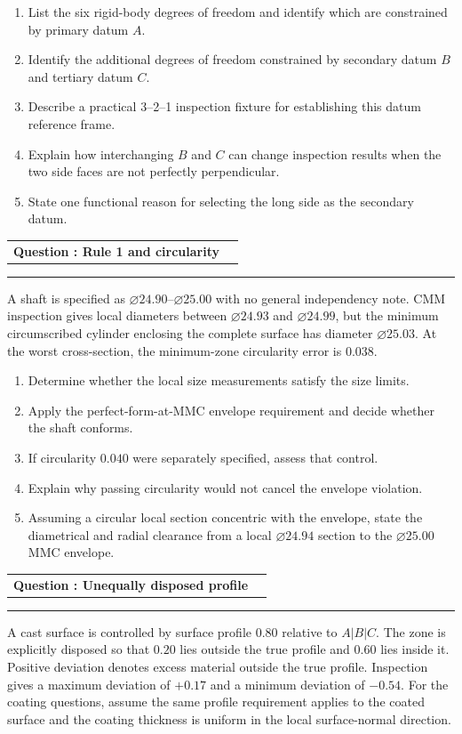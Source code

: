 \documentclass[11pt,a4paper]{article}
\makeatletter
\newcommand{\dia}{\ensuremath{\varnothing}}
\newcommand{\leveltag}[1]{%
  \fcolorbox{navy}{softgray}{\strut\small\bfseries\color{navy}#1}%
}
\newcommand{\qhead}[2]{%
  \clearpage
  \noindent\begin{tabularx}{\linewidth}{@{}Xr@{}}
  {\Large\bfseries\color{navy}Question \thequestion: #1} & \leveltag{#2}
  \end{tabularx}\par\vspace{-1mm}
  \noindent\rule{\linewidth}{0.6pt}\par\vspace{1mm}
}
\newcounter{question}
\newcommand{\question}[2]{\stepcounter{question}\qhead{#1}{#2}}
\makeatother
\begin{document}
\begin{enumerate}[label=(\alph*)]
\item List the six rigid-body degrees of freedom and identify which are constrained by primary datum $A$.
\item Identify the additional degrees of freedom constrained by secondary datum $B$ and tertiary datum $C$.
\item Describe a practical 3--2--1 inspection fixture for establishing this datum reference frame.
\item Explain how interchanging $B$ and $C$ can change inspection results when the two side faces are not perfectly perpendicular.
\item State one functional reason for selecting the long side as the secondary datum.
\end{enumerate}

\question{Rule 1 and circularity}{Level I}

A shaft is specified as \dia$24.90$--\dia$25.00$ with no general independency note. CMM inspection gives local diameters between \dia$24.93$ and \dia$24.99$, but the minimum circumscribed cylinder enclosing the complete surface has diameter \dia$25.03$. At the worst cross-section, the minimum-zone circularity error is $0.038$.

\begin{enumerate}[label=(\alph*)]
\item Determine whether the local size measurements satisfy the size limits.
\item Apply the perfect-form-at-MMC envelope requirement and decide whether the shaft conforms.
\item If circularity $0.040$ were separately specified, assess that control.
\item Explain why passing circularity would not cancel the envelope violation.
\item Assuming a circular local section concentric with the envelope, state the diametrical and radial clearance from a local \dia$24.94$ section to the \dia$25.00$ MMC envelope.
\end{enumerate}

\question{Unequally disposed profile}{Level I}

A cast surface is controlled by surface profile $0.80$ relative to $A|B|C$. The zone is explicitly disposed so that $0.20$ lies outside the true profile and $0.60$ lies inside it. Positive deviation denotes excess material outside the true profile. Inspection gives a maximum deviation of $+0.17$ and a minimum deviation of $-0.54$. For the coating questions, assume the same profile requirement applies to the coated surface and the coating thickness is uniform in the local surface-normal direction.
\end{document}
